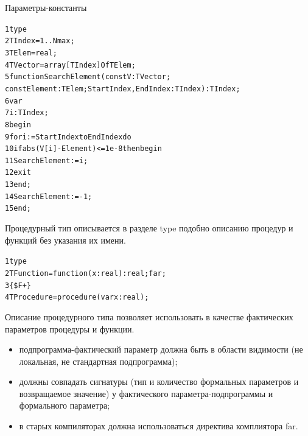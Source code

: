 \documentclass{beamer}
\begin{document}
\begin{frame}[fragile]{Параметры-константы}
\begin{alltt}
 1 type 
 2  TIndex = 1..Nmax;
 3  TElem = real;
 4  TVector = array[TIndex] Of TElem;
 5 function SearchElement(const V:TVector; 
     const Element:TElem; StartIndex, EndIndex: TIndex):TIndex;
 6 var 
 7   i: TIndex;
 8 begin
 9 for i := StartIndex to EndIndex do
10   if abs(V[i] - Element) <= 1e-8 then begin
11     SearchElement := i;        
12     exit
13   end;	
14   SearchElement := -1;
15 end;
\end{alltt}
\end{frame}

\begin{frame}[fragile]
\begin{block}{Процедурный тип}
описывается в разделе type подобно описанию процедур и функций без указания их имени.
\end{block}
\begin{alltt}
 1 type 
 2  TFunction = function(x:real):real; far;
 3  \{\$F+\}  
 4  TProcedure = procedure(var x:real); 
\end{alltt}
Описание процедурного типа позволяет использовать в качестве фактических параметров процедуры и функции.
\begin{itemize}
\item подпрограмма-фактический параметр должна быть в области видимости (не локальная, не стандартная подпрограмма);
\item должны совпадать сигнатуры (тип и количество формальных параметров и возвращаемое значение) у фактического параметра-подпрограммы и формального параметра;
\item в старых компиляторах должна использоваться директива комплиятора far.
\end{itemize}
\end{frame}
\end{document}
